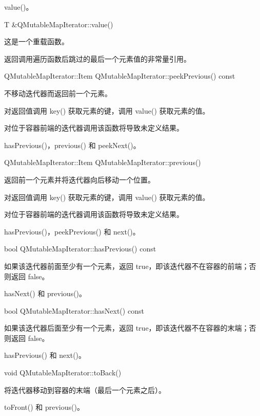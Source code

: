 \begin{seeAlso}
value()。
\end{seeAlso}

T \&QMutableMapIterator::value()

这是一个重载函数。

返回调用遍历函数后跳过的最后一个元素值的非常量引用。

QMutableMapIterator::Item QMutableMapIterator::peekPrevious() const

不移动迭代器而返回前一个元素。

对返回值调用 key() 获取元素的键，调用 value() 获取元素的值。

对位于容器前端的迭代器调用该函数将导致未定义结果。

\begin{seeAlso}
hasPrevious()，previous() 和 peekNext()。
\end{seeAlso}

QMutableMapIterator::Item QMutableMapIterator::previous()

返回前一个元素并将迭代器向后移动一个位置。

对返回值调用 key() 获取元素的键，调用 value() 获取元素的值。

对位于容器前端的迭代器调用该函数将导致未定义结果。

\begin{seeAlso}
hasPrevious()，peekPrevious() 和 next()。
\end{seeAlso}

bool QMutableMapIterator::hasPrevious() const

如果该迭代器前面至少有一个元素，返回 true，即该迭代器不在容器的前端；否则返回 false。

\begin{seeAlso}
hasNext() 和 previous()。
\end{seeAlso}

bool QMutableMapIterator::hasNext() const

如果该迭代器后面至少有一个元素，返回 true，即该迭代器不在容器的末端；否则返回 false。

\begin{seeAlso}
hasPrevious() 和 next()。
\end{seeAlso}

void QMutableMapIterator::toBack()

将迭代器移动到容器的末端（最后一个元素之后）。

\begin{seeAlso}
toFront() 和 previous()。
\end{seeAlso}

